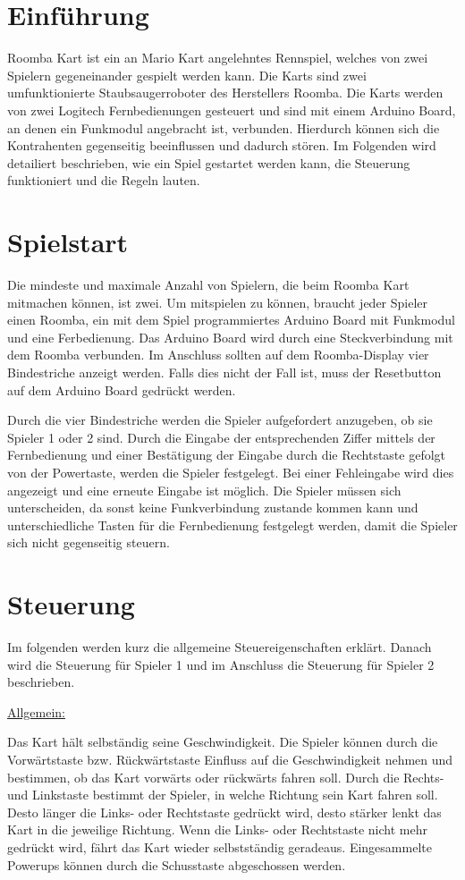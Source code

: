 \section{Einführung}
Roomba Kart ist ein an Mario Kart angelehntes Rennspiel, welches von zwei Spielern gegeneinander gespielt werden kann. Die Karts sind zwei umfunktionierte Staubsaugerroboter des Herstellers Roomba. Die Karts werden von zwei Logitech Fernbedienungen gesteuert und sind mit einem Arduino Board, an denen ein Funkmodul angebracht ist, verbunden. Hierdurch können sich die Kontrahenten gegenseitig beeinflussen und dadurch stören. Im Folgenden wird detailiert beschrieben, wie ein Spiel gestartet werden kann, die Steuerung funktioniert und die Regeln lauten. 

\section{Spielstart}
Die mindeste und maximale Anzahl von Spielern, die beim Roomba Kart mitmachen können, ist zwei. Um mitspielen zu können, braucht jeder Spieler einen Roomba, ein mit dem Spiel programmiertes Arduino Board mit Funkmodul und eine Ferbedienung. Das Arduino Board wird durch eine Steckverbindung mit dem Roomba verbunden. Im Anschluss sollten auf dem Roomba-Display vier Bindestriche anzeigt werden. Falls dies nicht der Fall ist, muss der Resetbutton auf dem Arduino Board gedrückt werden.

Durch die vier Bindestriche werden die Spieler aufgefordert anzugeben, ob sie Spieler 1 oder 2 sind. Durch die Eingabe der entsprechenden Ziffer mittels der Fernbedienung und einer Bestätigung der Eingabe durch die Rechtstaste gefolgt von der Powertaste, werden die Spieler festgelegt. Bei einer Fehleingabe wird dies angezeigt und eine erneute Eingabe ist möglich. Die Spieler müssen sich unterscheiden, da sonst keine Funkverbindung zustande kommen kann und unterschiedliche Tasten für die Fernbedienung festgelegt werden, damit die Spieler sich nicht gegenseitig steuern.
   
\section{Steuerung}
Im folgenden werden kurz die allgemeine Steuereigenschaften erklärt. Danach wird die Steuerung für Spieler 1 und im Anschluss die Steuerung für Spieler 2 beschrieben. 

\underline{Allgemein:} 

Das Kart hält selbständig seine Geschwindigkeit. Die Spieler können durch die Vorwärtstaste bzw. Rückwärtstaste Einfluss auf die Geschwindigkeit nehmen und bestimmen, ob das Kart vorwärts oder rückwärts fahren soll. Durch die Rechts- und Linkstaste bestimmt der Spieler, in welche Richtung sein Kart fahren soll. Desto länger die Links- oder Rechtstaste gedrückt wird, desto stärker lenkt das Kart in die jeweilige Richtung. Wenn die Links- oder Rechtstaste nicht mehr gedrückt wird, fährt das Kart wieder selbstständig geradeaus. Eingesammelte Powerups können durch die Schusstaste abgeschossen werden.

